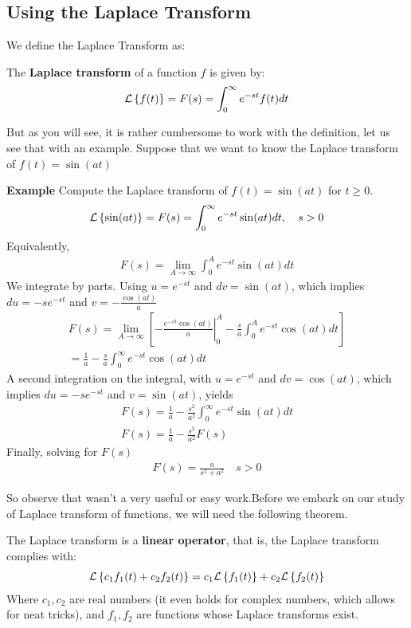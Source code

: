 \subsection{Using the Laplace Transform}
We define the Laplace Transform as:
\begin{define} \label{def:Laplace}
	The \textbf{Laplace transform} of a function $f$ is given by:
	\begin{align*}
	\mathcal{L}\left\lbrace f(t) \right\rbrace = F(s) = \int_0^{\infty} e^{-st}f(t)dt
	\end{align*}
\end{define}
But as you will see, it is rather cumbersome to work with the definition, let us see that with an example. Suppose that we want to know the Laplace transform of $f(t) = \sin(at) $ 
\begin{mdframed}
\textbf{Example} Compute the Laplace transform of $ f(t) = \sin(at) $ for $ t \geq 0 $.
\begin{align*}
\mathcal{L}\left\lbrace \sin(at) \right\rbrace = F(s) = \int_0^{\infty}e^{-st}\sin(at)dt, \quad s>0
\end{align*}
Equivalently,
\begin{align*}
F(s) = \lim_{A \rightarrow \infty} \int_0^{A}e^{-st}\sin(at)dt
\end{align*}
We integrate by parts. Using $u = e^{-st}$ and $dv= \sin(at)$, which implies $du = -se^{-st}$ and $ v = -\frac{\cos(at)}{a}$
\begin{align*}
F(s) = \lim_{A \rightarrow \infty} \left[ \left. -\frac{e^{-st}\cos(at)}{a} \right|_0^A - \frac{s}{a}\int_0^Ae^{-st}\cos(at)dt   \right] \\
=\frac{1}{a} - \frac{s}{a}\int_0^{\infty}e^{-st}\cos(at)dt
\end{align*}
A second integration on the integral, with $ u = e^{-st}$ and $ dv = \cos(at) $, which implies $ du = -se^{-st}$ and $ v = \sin(at)$, yields
\begin{align*}
F(s) = \frac{1}{a} - \frac{s^2}{a^2}\int_0^{\infty}e^{-st}\sin(at)dt \\
F(s) = \frac{1}{a} - \frac{s^2}{a^2}F(s)
\end{align*}
Finally, solving for $F(s)$
\begin{align*}
	F(s) = \frac{a}{s^2+a^2} \quad s>0
\end{align*}
\end{mdframed}
So observe that wasn't a very useful or easy work.Before we embark on our study of Laplace transform of functions, we will need the following theorem.
\begin{thm}
	The Laplace transform is a \textbf{linear operator}, that is, the Laplace transform complies with:
	\begin{align*}
	\mathcal{L}\left\lbrace c_1f_1(t) + c_2f_2(t) \right\rbrace = c_1\mathcal{L}\left\lbrace f_1(t) \right\rbrace + c_2\mathcal{L}\left\lbrace f_2(t) \right\rbrace
	\end{align*} 
	Where $c_1,c_2$ are real numbers (it even holds for complex numbers, which allows for neat tricks), and $f_1,f_2$ are functions whose Laplace transforms exist.
\end{thm} 
